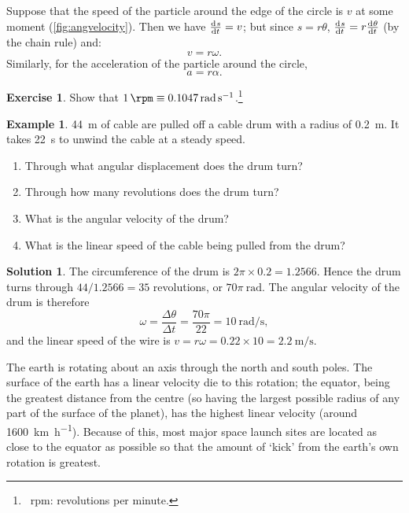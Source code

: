 \documentclass[a4paper]{amsbook}
\theoremstyle{definition}
\newtheorem*{example}{Example}
\newtheorem{exercise}{Exercise}
\numberwithin{exercise}{chapter}
\numberwithin{exercise}{chapter}
\newtheorem*{solution}{Solution}
\begin{document}
Suppose that the speed of the particle around the edge of the circle is $ v $ at some moment (\cref{fig:angvelocity}). Then we have $ \od{s}{t} = v $;
but since $ s = r\theta $, $ \od{s}{t} = r\od{\theta}{t} $ (by the chain rule) and:
\begin{equation}
  v = r\omega.
\end{equation}
Similarly, for the acceleration of the particle around the circle,
\begin{equation}
  a = r\alpha.
\end{equation}

\begin{exercise}
  Show that $ \SI{1}{\rpm} \equiv \SI{0.1047}{\radian\per\second} $.\footnote{~rpm: revolutions per minute.}
\end{exercise}

\begin{example}
  \SI{44}{\metre} of cable are pulled off a cable drum with a radius of \SI{0.2}{\metre}. It takes \SI{22}{\second} to unwind
  the cable at a steady speed.
  \begin{enumerate}
    \item Through what angular displacement does the drum turn?
    \item Through how many revolutions does the drum turn?
    \item What is the angular velocity of the drum?
    \item What is the linear speed of the cable being pulled from the drum?
  \end{enumerate}
\end{example}
\begin{solution}
  The circumference of the drum is $ 2\pi \times 0.2 = 1.2566 $. Hence the drum turns through $ 44/1.2566 = 35 $ revolutions,
  or $ 70\pi~\si{\radian} $. The angular velocity of the drum is therefore
  \begin{displaymath}
    \omega = \frac{\Delta \theta}{\Delta t} = \frac{70\pi}{22} = \SI{10}{\radian\per\second},
  \end{displaymath}
  and the linear speed of the wire is $ v = r\omega = 0.22 \times 10 = \SI{2.2}{\metre\per\second} $.
\end{solution}

The earth is rotating about an axis through the north and south poles. The surface of the earth has a linear velocity die to this
rotation; the equator, being the greatest distance from the centre (so having the largest possible radius of any part of the surface
of the planet), has the highest linear velocity (around \SI{1600}{\kilo\metre\per\hour}). Because of this, most major space launch
sites are located as close to the equator as possible so that the amount of `kick' from the earth's own rotation is greatest.
\end{document}
